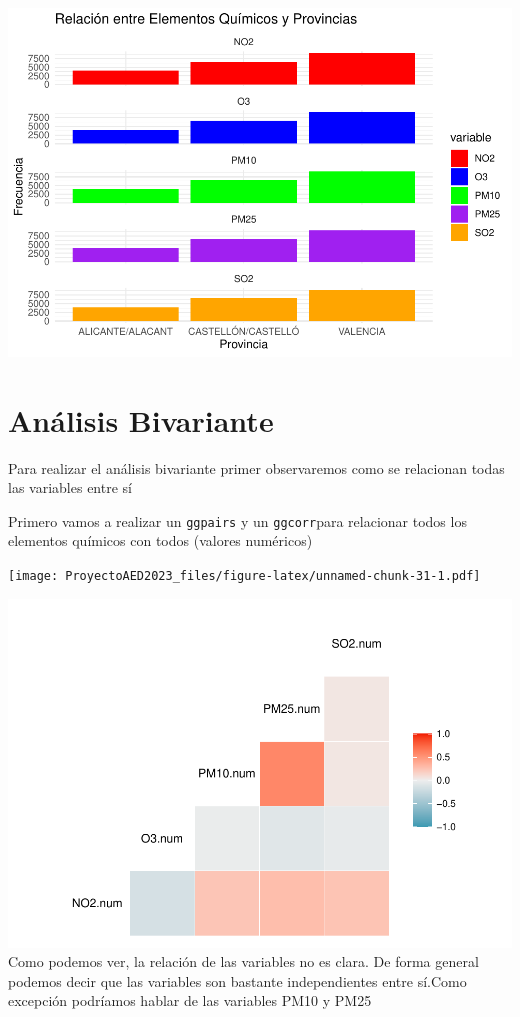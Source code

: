 \documentclass[notspecified,article,submit,moreauthors,pdftex]{Definitions/mdpi}
\begin{document}
\includegraphics{ProyectoAED2023_files/figure-latex/unnamed-chunk-29-1.pdf}

\hypertarget{anuxe1lisis-bivariante}{%
\section{Análisis Bivariante}\label{anuxe1lisis-bivariante}}

Para realizar el análisis bivariante primer observaremos como se
relacionan todas las variables entre sí

Primero vamos a realizar un \texttt{ggpairs} y un \texttt{ggcorr}para
relacionar todos los elementos químicos con todos (valores numéricos)

\texttt{[image: ProyectoAED2023\_files/figure-latex/unnamed-chunk-31-1.pdf]}

\includegraphics{ProyectoAED2023_files/figure-latex/unnamed-chunk-32-1.pdf}
Como podemos ver, la relación de las variables no es clara. De forma
general podemos decir que las variables son bastante independientes
entre sí.Como excepción podríamos hablar de las variables PM10 y PM25
\end{document}

